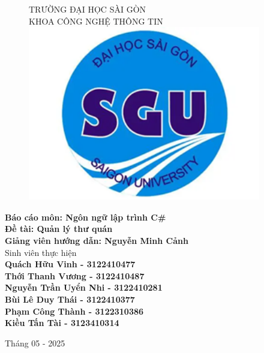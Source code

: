 \begin{titlepage}
\begin{figure}[!t]
\centering
\Large{TRƯỜNG ĐẠI HỌC SÀI GÒN \\ KHOA CÔNG NGHỆ THÔNG TIN
}\\[0.4in]

\includegraphics[width = 4in]{images/SGU.png}
\end{figure}

\centering
\LARGE{\textbf{Báo cáo môn: Ngôn ngữ lập trình C\#}}\\[0.2in]
\LARGE{\textbf{Đề tài: Quản lý thư quán}}\\[0.4in]
\LARGE{\textbf{Giảng viên hướng dẫn: Nguyễn Minh Cảnh}}\\[0.4in]

\LARGE{Sinh viên thực hiện}\\[0.2in]
\LARGE{\textbf{Quách Hữu Vinh - 3122410477}}\\[0.1in]
\LARGE{\textbf{Thới Thanh Vương - 3122410487}}\\[0.1in]
\LARGE{\textbf{Nguyễn Trần Uyển Nhi - 3122410281}}\\[0.1in]
\LARGE{\textbf{Bùi Lê Duy Thái - 3122410377}}\\[0.1in]
\LARGE{\textbf{Phạm Công Thành - 3122310386}}\\[0.1in]
\LARGE{\textbf{Kiều Tấn Tài - 3123410314}}\\[0.1in]


\vfill
\begin{center}
    \Large{Tháng 05 - 2025}
\end{center}
\newpage
\end{titlepage}